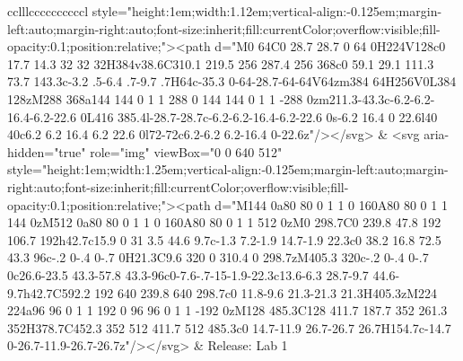 \documentclass[
]{article}
\begin{document}
\begin{figure*}
\begin{longtable*}{cclllccccccccccl}
style="height:1em;width:1.12em;vertical-align:-0.125em;margin-left:auto;margin-right:auto;font-size:inherit;fill:currentColor;overflow:visible;fill-opacity:0.1;position:relative;"><path d="M0 64C0 28.7 28.7 0 64 0H224V128c0 17.7 14.3 32 32 32H384v38.6C310.1 219.5 256 287.4 256 368c0 59.1 29.1 111.3 73.7 143.3c-3.2 .5-6.4 .7-9.7 .7H64c-35.3 0-64-28.7-64-64V64zm384 64H256V0L384 128zM288 368a144 144 0 1 1 288 0 144 144 0 1 1 -288 0zm211.3-43.3c-6.2-6.2-16.4-6.2-22.6 0L416 385.4l-28.7-28.7c-6.2-6.2-16.4-6.2-22.6 0s-6.2 16.4 0 22.6l40 40c6.2 6.2 16.4 6.2 22.6 0l72-72c6.2-6.2 6.2-16.4 0-22.6z"/></svg> & <svg aria-hidden="true" role="img" viewBox="0 0 640 512" style="height:1em;width:1.25em;vertical-align:-0.125em;margin-left:auto;margin-right:auto;font-size:inherit;fill:currentColor;overflow:visible;fill-opacity:0.1;position:relative;"><path d="M144 0a80 80 0 1 1 0 160A80 80 0 1 1 144 0zM512 0a80 80 0 1 1 0 160A80 80 0 1 1 512 0zM0 298.7C0 239.8 47.8 192 106.7 192h42.7c15.9 0 31 3.5 44.6 9.7c-1.3 7.2-1.9 14.7-1.9 22.3c0 38.2 16.8 72.5 43.3 96c-.2 0-.4 0-.7 0H21.3C9.6 320 0 310.4 0 298.7zM405.3 320c-.2 0-.4 0-.7 0c26.6-23.5 43.3-57.8 43.3-96c0-7.6-.7-15-1.9-22.3c13.6-6.3 28.7-9.7 44.6-9.7h42.7C592.2 192 640 239.8 640 298.7c0 11.8-9.6 21.3-21.3 21.3H405.3zM224 224a96 96 0 1 1 192 0 96 96 0 1 1 -192 0zM128 485.3C128 411.7 187.7 352 261.3 352H378.7C452.3 352 512 411.7 512 485.3c0 14.7-11.9 26.7-26.7 26.7H154.7c-14.7 0-26.7-11.9-26.7-26.7z"/></svg> & Release: Lab 1 \\ 

\end{longtable*}
\end{figure*}
\end{document}
